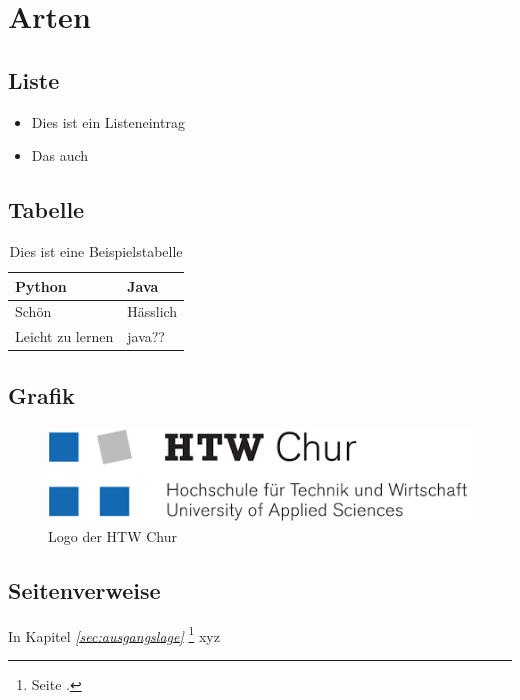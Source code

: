\documentclass{htwchur}
\begin{document}
\section{Arten} \label{sec:zielsetzung_und_forschungsfrage}

\subsection{Liste}

\begin{itemize}
	\setlength{\parskip}{0pt}
	\item Dies ist ein Listeneintrag
	\item Das auch
\end{itemize}

\subsection{Tabelle}

\begin{table}[H]
\renewcommand{\arraystretch}{1.5}
\centering
\begin{tabular}{|l|l|}
	\hline
	\textbf{Python}       & \textbf{Java}                   \\ \hline
	Schön & Hässlich                       \\ \hline
	Leicht zu lernen         & java??                                 \\ \hline

\end{tabular} \caption{Dies ist eine Beispielstabelle}	
\end{table}

\subsection{Grafik}

\begin{figure}[H]
	\centering
	\includegraphics[scale = 0.85]{Bilder/HTW_Logo.png}
	\caption[Logo der HTW Chur]{Logo der HTW Chur}
	\label{fig:workflow}
\end{figure}


\subsection{Seitenverweise} \label{sec:Verweis}
In Kapitel \textit{\ref{sec:ausgangslage} }\footnote{Seite \pageref{sec:ausgangslage}.} xyz
\end{document}
